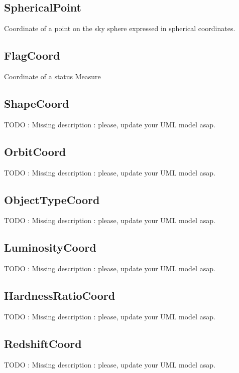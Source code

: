   \subsection{SphericalPoint}
  \label{sect:stcextend.SphericalPoint}
  Coordinate of a point on the sky sphere expressed in spherical coordinates.

  \subsection{FlagCoord}
  \label{sect:stcextend.FlagCoord}
  Coordinate of a status Measure

  \subsection{ShapeCoord}
  \label{sect:stcextend.ShapeCoord}
  TODO : Missing description : please, update your UML model asap.

  \subsection{OrbitCoord}
  \label{sect:stcextend.OrbitCoord}
  TODO : Missing description : please, update your UML model asap.

  \subsection{ObjectTypeCoord}
  \label{sect:stcextend.ObjectTypeCoord}
  TODO : Missing description : please, update your UML model asap.

  \subsection{LuminosityCoord}
  \label{sect:stcextend.LuminosityCoord}
  TODO : Missing description : please, update your UML model asap.

  \subsection{HardnessRatioCoord}
  \label{sect:stcextend.HardnessRatioCoord}
  TODO : Missing description : please, update your UML model asap.

  \subsection{RedshiftCoord}
  \label{sect:stcextend.RedshiftCoord}
  TODO : Missing description : please, update your UML model asap.

